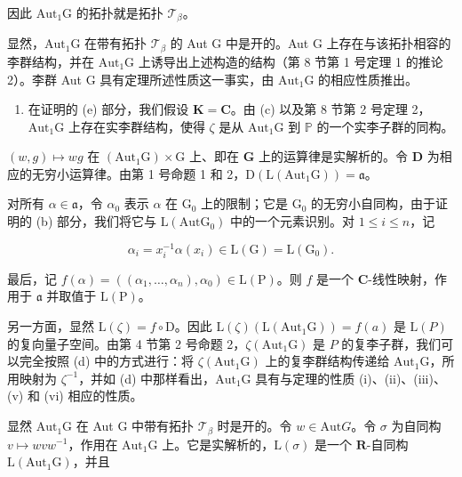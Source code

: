 因此 \(\mathrm{Aut}_1\mathrm{G}\) 的拓扑就是拓扑 \(\mathcal{T}_{\beta}\)。

显然，\(\mathrm{Aut}_1\mathrm{G}\) 在带有拓扑 \(\mathcal{T}_{\beta}\) 的 Aut G 中是开的。Aut G 上存在与该拓扑相容的李群结构，并在 \(\mathrm{Aut}_1\mathrm{G}\) 上诱导出上述构造的结构（第 8 节第 1 号定理 1 的推论 2）。李群 Aut G 具有定理所述性质这一事实，由 \(\mathrm{Aut}_1\mathrm{G}\) 的相应性质推出。

\begin{enumerate}
\def\labelenumi{(\alph{enumi})}
\setcounter{enumi}{4}
\tightlist
\item
  在证明的 (e) 部分，我们假设 \(\mathbf{K} = \mathbf{C}\)。由 (c) 以及第 8 节第 2 号定理 2，\(\mathrm{Aut}_1\mathrm{G}\) 上存在实李群结构，使得 \(\zeta\) 是从 \(\mathrm{Aut}_1\mathrm{G}\) 到 \(\mathbb{P}\) 的一个实李子群的同构。
\end{enumerate}

\((w, g) \mapsto wg\) 在 \((\mathrm{Aut}_1\mathrm{G}) \times \mathrm{G}\) 上、即在 \(\mathbf{G}\) 上的运算律是实解析的。令 \(\mathbf{D}\) 为相应的无穷小运算律。由第 1 号命题 1 和 2，\(\mathrm{D}(\mathrm{L}(\mathrm{Aut}_1\mathrm{G})) = \mathfrak{a}\)。

对所有 \(\alpha \in \mathfrak{a}\)，令 \(\alpha_0\) 表示 \(\alpha\) 在 \(\mathrm{G}_0\) 上的限制；它是 \(\mathrm{G}_0\) 的无穷小自同构，由于证明的 (b) 部分，我们将它与 \(\mathrm{L}(\mathrm{Aut}\mathrm{G}_0)\) 中的一个元素识别。对 \(1 \leqslant i \leqslant n\)，记

\[
\alpha_ {i} = x _ {i} ^ {- 1} \alpha (x _ {i}) \in \mathrm{L} (\mathrm{G}) = \mathrm{L} (\mathrm{G} _ {0}).
\]

最后，记 \(f(\alpha) = ((\alpha_1, \ldots, \alpha_n), \alpha_0) \in \mathrm{L}(\mathrm{P})\)。则 \(f\) 是一个 \(\mathbf{C}\)-线性映射，作用于 \(\mathfrak{a}\) 并取值于 \(\mathrm{L}(\mathrm{P})\)。

另一方面，显然 \(\mathrm{L}(\zeta) = f\circ \mathrm{D}\)。因此 \(\mathrm{L}(\zeta)(\mathrm{L}(\mathrm{Aut}_1\mathrm{G})) = f(a)\) 是 \(\mathrm{L}(P)\) 的复向量子空间。由第 4 节第 2 号命题 2，\(\zeta (\mathrm{Aut}_1\mathrm{G})\) 是 \(P\) 的复李子群，我们可以完全按照 (d) 中的方式进行：将 \(\zeta (\mathrm{Aut}_1\mathrm{G})\) 上的复李群结构传递给 \(\mathrm{Aut}_1\mathrm{G}\)，所用映射为 \(\zeta^{-1}\)，并如 (d) 中那样看出，\(\mathrm{Aut}_1\mathrm{G}\) 具有与定理的性质 (i)、(ii)、(iii)、(v) 和 (vi) 相应的性质。

显然 \(\mathrm{Aut}_1\mathrm{G}\) 在 Aut G 中带有拓扑 \(\mathcal{T}_{\beta}\) 时是开的。令 \(w\in \mathrm{Aut}G\)。令 \(\sigma\) 为自同构 \(v\mapsto wvw^{-1}\)，作用在 \(\mathrm{Aut}_1\mathrm{G}\) 上。它是实解析的，\(\mathrm{L}(\sigma)\) 是一个 \(\mathbf{R}\)-自同构 \(\mathrm{L}(\mathrm{Aut}_1\mathrm{G})\)，并且

